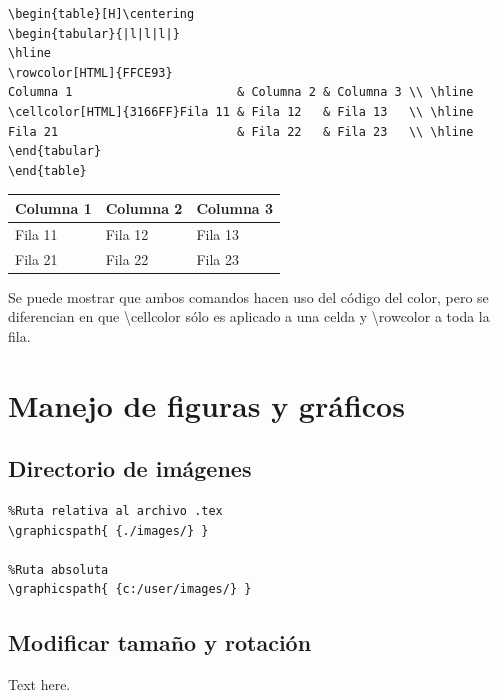 \documentclass[letterpaper, 10pt, journal]{IEEEtran}
\begin{document}
\lstset{language=Java}
\begin{lstlisting}
\begin{table}[H]\centering
\begin{tabular}{|l|l|l|}
\hline
\rowcolor[HTML]{FFCE93} 
Columna 1                       & Columna 2 & Columna 3 \\ \hline
\cellcolor[HTML]{3166FF}Fila 11 & Fila 12   & Fila 13   \\ \hline
Fila 21                         & Fila 22   & Fila 23   \\ \hline
\end{tabular}
\end{table}
\end{lstlisting}

\begin{table}[H]\centering
\begin{tabular}{|l|l|l|}
\hline
\rowcolor[HTML]{FFCE93} 
Columna 1                       & Columna 2 & Columna 3 \\ \hline
\cellcolor[HTML]{3166FF}Fila 11 & Fila 12   & Fila 13   \\ \hline
Fila 21                         & Fila 22   & Fila 23   \\ \hline
\end{tabular}
\end{table}

Se puede mostrar que ambos comandos hacen uso del c\'{o}digo del color, pero se diferencian en que \textbackslash{}cellcolor s\'{o}lo es aplicado a una celda y \textbackslash{}rowcolor a toda la fila.

\section{Manejo de figuras y gr\'aficos}
\subsection{Directorio de im\'agenes}

\lstset{language=Java}
\begin{lstlisting}
%Ruta relativa al archivo .tex 
\graphicspath{ {./images/} }

%Ruta absoluta
\graphicspath{ {c:/user/images/} }
\end{lstlisting}

\subsection{Modificar tama\~no y rotaci\'on}
Text here.\\
\end{document}

